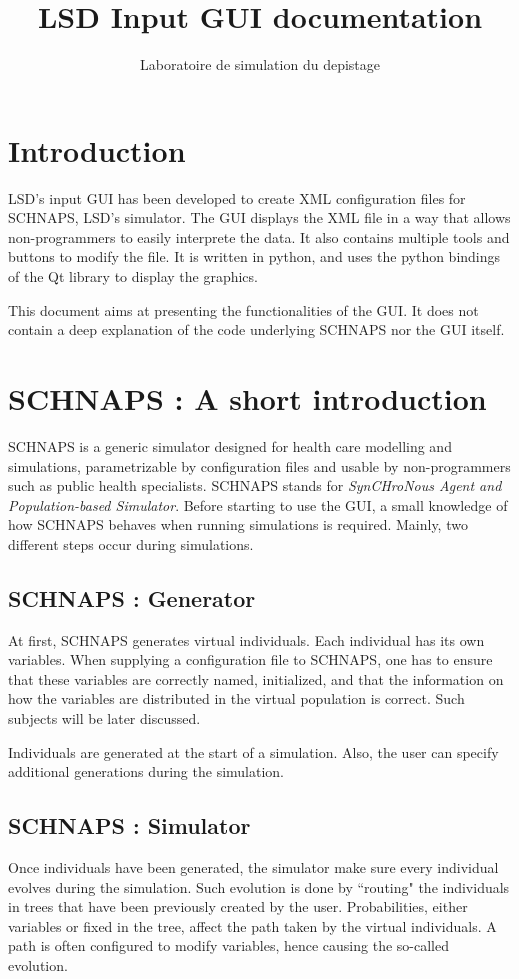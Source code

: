 \documentclass[a4paper,11pt]{report}
\author{Laboratoire de simulation du depistage}
\title{LSD Input GUI documentation}
\begin{document}
\maketitle
\tableofcontents

\chapter{Introduction}
LSD's input GUI has been developed to create XML configuration files for SCHNAPS, LSD's simulator. The GUI displays the XML file in a way that allows non-programmers to easily interprete the data. It also contains multiple tools and buttons to modify the file. It is written in python, and uses the python bindings of the Qt library to display the graphics.

This document aims at presenting the functionalities of the GUI. It does not contain a deep explanation of the code underlying SCHNAPS nor the GUI itself. 

\chapter{SCHNAPS : A short introduction}
SCHNAPS is a generic simulator designed for health care modelling and simulations, parametrizable by configuration files and usable by non-programmers such as public health specialists. SCHNAPS stands for \emph{SynCHroNous Agent and Population-based Simulator}. Before starting to use the GUI, a small knowledge of how SCHNAPS behaves when running simulations is required. Mainly, two different steps occur during simulations.

\section{SCHNAPS : Generator}
At first, SCHNAPS generates virtual individuals. Each individual has its own variables. When supplying a configuration file to SCHNAPS, one has to ensure that these variables are correctly named, initialized, and that the information on how the variables are distributed in the virtual population is correct. Such subjects will be later discussed.

Individuals are generated at the start of a simulation. Also, the user can specify additional generations during the simulation.

\section{SCHNAPS : Simulator}
Once individuals have been generated, the simulator make sure every individual evolves during the simulation. Such evolution is done by ``routing" the individuals in trees that have been previously created by the user. Probabilities, either variables or fixed in the tree, affect the path taken by the virtual individuals. A path is often configured to modify variables, hence causing the so-called evolution.
\end{document}
